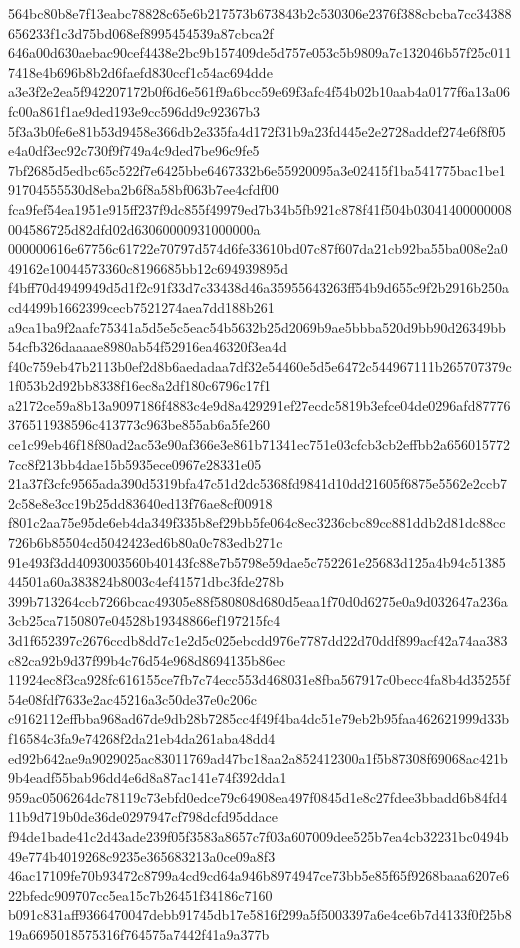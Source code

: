\documentclass[11pt,a4paper]{article}
\begin{document}
{564bc80b8e7f13eabc78828c65e6b217573b673843b2c530306e2376f388cbcba7cc34388656233f1c3d75bd068ef8995454539a87cbca2f
646a00d630aebac90cef4438e2bc9b157409de5d757e053c5b9809a7c132046b57f25c0117418e4b696b8b2d6faefd830ccf1c54ac694dde
a3e3f2e2ea5f942207172b0f6d6e561f9a6bcc59e69f3afc4f54b02b10aab4a0177f6a13a06fc00a861f1ae9ded193e9cc596dd9c92367b3
5f3a3b0fe6e81b53d9458e366db2e335fa4d172f31b9a23fd445e2e2728addef274e6f8f05e4a0df3ec92c730f9f749a4c9ded7be96c9fe5
7bf2685d5edbc65c522f7e6425bbe6467332b6e55920095a3e02415f1ba541775bac1be191704555530d8eba2b6f8a58bf063b7ee4cfdf00
fca9fef54ea1951e915ff237f9dc855f49979ed7b34b5fb921c878f41f504b03041400000008004586725d82dfd02d63060000931000000a
000000616e67756c61722e70797d574d6fe33610bd07c87f607da21cb92ba55ba008e2a049162e10044573360c8196685bb12c694939895d
f4bff70d4949949d5d1f2c91f33d7c33438d46a35955643263ff54b9d655c9f2b2916b250acd4499b1662399cecb7521274aea7dd188b261
a9ca1ba9f2aafc75341a5d5e5c5eac54b5632b25d2069b9ae5bbba520d9bb90d26349bb54cfb326daaaae8980ab54f52916ea46320f3ea4d
f40c759eb47b2113b0ef2d8b6aedadaa7df32e54460e5d5e6472c544967111b265707379c1f053b2d92bb8338f16ec8a2df180c6796c17f1
a2172ce59a8b13a9097186f4883c4e9d8a429291ef27ecdc5819b3efce04de0296afd87776376511938596c413773c963be855ab6a5fe260
ce1c99eb46f18f80ad2ac53e90af366e3e861b71341ec751e03cfcb3cb2effbb2a6560157727cc8f213bb4dae15b5935ece0967e28331e05
21a37f3cfc9565ada390d5319bfa47c51d2dc5368fd9841d10dd21605f6875e5562e2ccb72c58e8e3cc19b25dd83640ed13f76ae8cf00918
f801c2aa75e95de6eb4da349f335b8ef29bb5fe064c8ec3236cbc89cc881ddb2d81dc88cc726b6b85504cd5042423ed6b80a0c783edb271c
91e493f3dd4093003560b40143fc88e7b5798e59dae5c752261e25683d125a4b94c5138544501a60a383824b8003c4ef41571dbc3fde278b
399b713264ccb7266bcac49305e88f580808d680d5eaa1f70d0d6275e0a9d032647a236a3cb25ca7150807e04528b19348866ef197215fc4
3d1f652397c2676ccdb8dd7c1e2d5c025ebcdd976e7787dd22d70ddf899acf42a74aa383c82ca92b9d37f99b4c76d54e968d8694135b86ec
11924ec8f3ca928fc616155ce7fb7c74ecc553d468031e8fba567917c0becc4fa8b4d35255f54e08fdf7633e2ac45216a3c50de37e0c206c
c9162112effbba968ad67de9db28b7285cc4f49f4ba4dc51e79eb2b95faa462621999d33bf16584c3fa9e74268f2da21eb4da261aba48dd4
ed92b642ae9a9029025ac83011769ad47bc18aa2a852412300a1f5b87308f69068ac421b9b4eadf55bab96dd4e6d8a87ac141e74f392dda1
959ac0506264dc78119c73ebfd0edce79c64908ea497f0845d1e8c27fdee3bbadd6b84fd411b9d719b0de36de0297947cf798dcfd95ddace
f94de1bade41c2d43ade239f05f3583a8657c7f03a607009dee525b7ea4cb32231bc0494b49e774b4019268c9235e365683213a0ce09a8f3
46ac17109fe70b93472c8799a4cd9cd64a946b8974947ce73bb5e85f65f9268baaa6207e622bfedc909707cc5ea15c7b26451f34186c7160
b091c831aff9366470047debb91745db17e5816f299a5f5003397a6e4ce6b7d4133f0f25b819a6695018575316f764575a7442f41a9a377b
}
\end{document}
